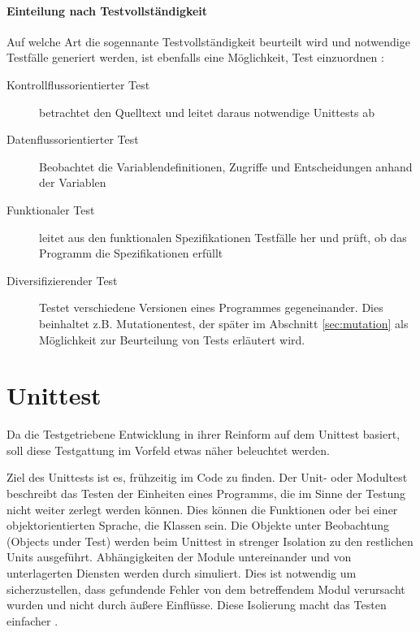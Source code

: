 \paragraph{Einteilung nach Testvollständigkeit} Auf welche Art die sogennante Testvollständigkeit beurteilt wird und notwendige Testfälle generiert werden, ist ebenfalls eine Möglichkeit, Test einzuordnen \citep{liggesmeyer_modultest_1990}:
\begin{description}
 \item[Kontrollflussorientierter Test] betrachtet den Quelltext und leitet daraus notwendige Unittests ab
 \item[Datenflussorientierter Test] Beobachtet die Variablendefinitionen, Zugriffe und Entscheidungen anhand der Variablen
 \item[Funktionaler Test] leitet aus den funktionalen Spezifikationen Testfälle her und prüft, ob das Programm die Spezifikationen erfüllt
 \item[Diversifizierender Test] Testet verschiedene Versionen eines Programmes gegeneinander. Dies beinhaltet z.B. Mutationentest, der später im Abschnitt \ref{sec:mutation} \textit{} als Möglichkeit zur Beurteilung von Tests erläutert wird.
\end{description}
\section{Unittest}
\label{sec:testUnit}
Da die Testgetriebene Entwicklung in ihrer Reinform auf dem Unittest basiert, soll diese Testgattung im Vorfeld etwas näher beleuchtet werden.

Ziel des Unittests ist es, frühzeitig  im Code zu finden. Der Unit- oder Modultest beschreibt das Testen der Einheiten eines Programms, die im Sinne der Testung nicht weiter zerlegt werden können. Dies können die Funktionen oder bei einer objektorientierten Sprache, die Klassen sein. Die Objekte unter Beobachtung (Objects under Test) werden beim Unittest in strenger Isolation zu den restlichen Units ausgeführt. Abhängigkeiten der Module untereinander und von unterlagerten Diensten werden durch  simuliert. Dies ist notwendig um sicherzustellen, dass gefundende Fehler von dem betreffendem Modul verursacht wurden und nicht durch äußere Einflüsse. Diese Isolierung macht das Testen einfacher \citep{goodliffe_code_2006,liggesmeyer_modultest_1990}.



